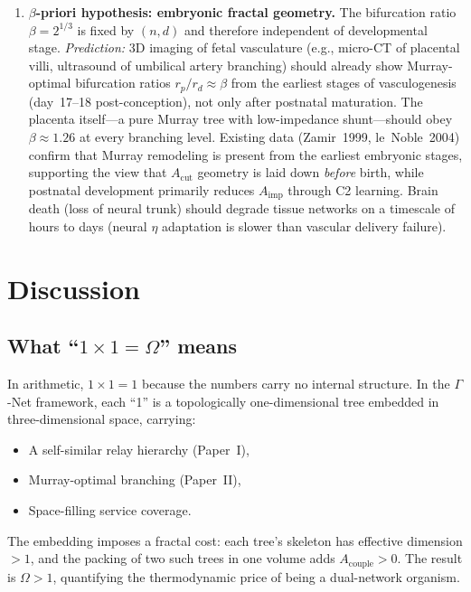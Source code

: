 \documentclass[aps,pre,twocolumn,superscriptaddress,longbibliography]{revtex4-2}
\newcommand{\Acut}{A_{\text{cut}}}
\newcommand{\Aimp}{A_{\text{imp}}}
\newcommand{\Acouple}{A_{\text{couple}}}
\begin{document}
\begin{enumerate}
  \item \textbf{$\beta$-priori hypothesis: embryonic
    fractal geometry.}
    The bifurcation ratio $\beta = 2^{1/3}$ is fixed by
    $(n, d)$ and therefore independent of developmental
    stage.
    \emph{Prediction:} 3D imaging of fetal vasculature
    (e.g., micro-CT of placental villi, ultrasound of
    umbilical artery branching) should already show
    Murray-optimal bifurcation ratios
    $r_p / r_d \approx \beta$ from the earliest stages
    of vasculogenesis (day~17--18 post-conception),
    not only after postnatal maturation.
    The placenta itself---a pure Murray tree with
    low-impedance shunt---should obey $\beta \approx 1.26$
    at every branching level.
    Existing data (Zamir~1999, le~Noble~2004) confirm that
    Murray remodeling is present from the earliest
    embryonic stages, supporting the view that $\Acut$
    geometry is laid down \emph{before} birth, while
    postnatal development primarily reduces $\Aimp$
    through C2 learning.
    Brain death (loss of neural trunk) should degrade
    tissue networks on a timescale of hours to days
    (neural $\eta$ adaptation is slower than vascular
    delivery failure).
\end{enumerate}


\section{Discussion}
\label{sec:discussion}

\subsection{What ``$1 \times 1 = \Omega$'' means}

In arithmetic, $1 \times 1 = 1$ because the numbers
carry no internal structure.
In the $\Gamma$-Net framework, each ``1'' is a
topologically one-dimensional tree embedded in
three-dimensional space, carrying:
\begin{itemize}
  \item A self-similar relay hierarchy (Paper~I),
  \item Murray-optimal branching (Paper~II),
  \item Space-filling service coverage.
\end{itemize}

The embedding imposes a fractal cost: each tree's
skeleton has effective dimension $> 1$, and the packing
of two such trees in one volume adds $\Acouple > 0$.
The result is $\Omega > 1$, quantifying the thermodynamic
price of being a dual-network organism.
\end{document}
